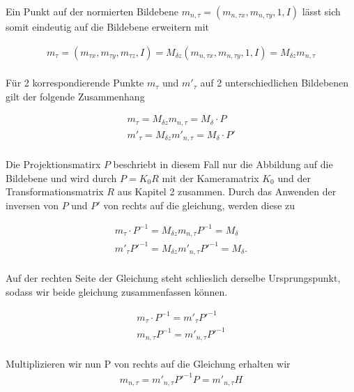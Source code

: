
Ein Punkt auf der normierten Bildebene $m_{n,\tau}=(m_{n,\tau x},m_{n,\tau y},1, I)$ lässt sich somit eindeutig auf die Bildebene erweitern mit 

\begin{gather}
m_{\tau}=(m_{\tau x},m_{\tau y},m_{\tau z}, I) = M_{\delta z}(m_{n,\tau x},m_{n,\tau y},1, I)=M_{\delta z}m_{n,\tau}
\end{gather}\\

Für 2 korrespondierende Punkte $m_{\tau}$ und $m'_{\tau}$ auf 2 unterschiedlichen Bildebenen gilt der folgende Zusammenhang


\begin{gather}
m_{\tau}=M_{\delta z}m_{n,\tau} = M_{\delta} \cdot P \\
m'_{\tau}=M_{\delta z}m'_{n,\tau} = M_{\delta} \cdot P'
\end{gather}\\

Die Projektionsmatirx $P$ beschriebt in diesem Fall nur die Abbildung auf die Bildebene und wird durch $P=K_0R$ mit der Kameramatrix $K_0$ und der Transformationsmatrix $R$ aus Kapitel 2 zusammen. Durch das Anwenden der inversen von $P$ und $P'$ von rechts auf die gleichung, werden diese zu

 
 \begin{gather}
 	m_{\tau}\cdot P^{-1}=M_{\delta z}m_{n,\tau}P^{-1} = M_{\delta} \\
 	m'_{\tau}P'^{-1}=M_{\delta z}m'_{n,\tau}P'^{-1} = M_{\delta}.
 \end{gather}\\

Auf der rechten Seite der Gleichung steht schlieslich derselbe Ursprungspunkt, sodass wir beide gleichung zusammenfassen können. 

 \begin{gather}
	m_{\tau}\cdot P^{-1} = m'_{\tau}P'^{-1} \\
	m_{n,\tau}P^{-1}=m'_{n,\tau}P'^{-1}
\end{gather}\\

Multiplizieren wir nun P von rechts auf die Gleichung erhalten wir 
 \begin{gather}
	m_{n,\tau}=m'_{n,\tau}P'^{-1}P=m'_{n,\tau}H
\end{gather}\\

